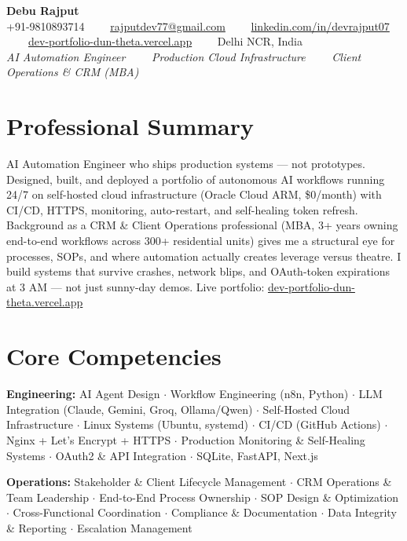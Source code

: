 \documentclass[a4paper,11pt]{article}
\begin{document}
\begin{center}
  {\Huge\bfseries Debu Rajput}\\[6pt]
  +91-9810893714 \ \ \textbar \ \ \href{mailto:rajputdev77@gmail.com}{rajputdev77@gmail.com} \ \ \textbar \ \ \href{https://www.linkedin.com/in/devrajput07/}{\color{accent}linkedin.com/in/devrajput07} \ \ \textbar \ \ \href{https://dev-portfolio-dun-theta.vercel.app}{\color{accent}dev-portfolio-dun-theta.vercel.app} \ \ \textbar \ \ Delhi NCR, India\\[4pt]
  \textit{\color{accent}AI Automation Engineer \ \ \textbar \ \ Production Cloud Infrastructure \ \ \textbar \ \ Client Operations \& CRM (MBA)}
\end{center}

\vspace{2pt}

\section*{Professional Summary}
AI Automation Engineer who ships production systems --- not prototypes. Designed, built, and deployed a portfolio of autonomous AI workflows running 24/7 on self-hosted cloud infrastructure (Oracle Cloud ARM, \$0/month) with CI/CD, HTTPS, monitoring, auto-restart, and self-healing token refresh. Background as a CRM \& Client Operations professional (MBA, 3+ years owning end-to-end workflows across 300+ residential units) gives me a structural eye for processes, SOPs, and where automation actually creates leverage versus theatre. I build systems that survive crashes, network blips, and OAuth-token expirations at 3 AM --- not just sunny-day demos. Live portfolio: \href{https://dev-portfolio-dun-theta.vercel.app}{\color{accent}dev-portfolio-dun-theta.vercel.app}

\section*{Core Competencies}
\textbf{Engineering:} AI Agent Design $\cdot$ Workflow Engineering (n8n, Python) $\cdot$ LLM Integration (Claude, Gemini, Groq, Ollama/Qwen) $\cdot$ Self-Hosted Cloud Infrastructure $\cdot$ Linux Systems (Ubuntu, systemd) $\cdot$ CI/CD (GitHub Actions) $\cdot$ Nginx + Let's Encrypt + HTTPS $\cdot$ Production Monitoring \& Self-Healing Systems $\cdot$ OAuth2 \& API Integration $\cdot$ SQLite, FastAPI, Next.js

\textbf{Operations:} Stakeholder \& Client Lifecycle Management $\cdot$ CRM Operations \& Team Leadership $\cdot$ End-to-End Process Ownership $\cdot$ SOP Design \& Optimization $\cdot$ Cross-Functional Coordination $\cdot$ Compliance \& Documentation $\cdot$ Data Integrity \& Reporting $\cdot$ Escalation Management
\end{document}
